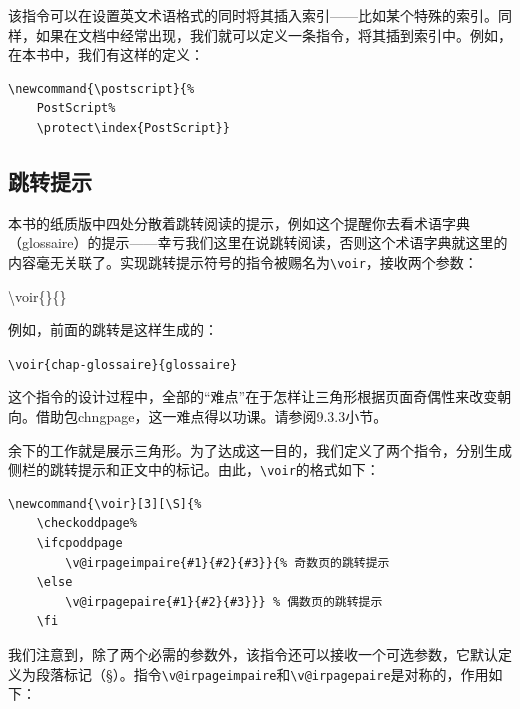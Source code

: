 该指令可以在设置英文术语格式的同时将其插入索引——比如某个特殊的索引。同样，如果在文档中经常出现，我们就可以定义一条指令，将其插到索引中。例如，在本书中，我们有这样的定义：

\begin{dmd}
\begin{verbatim}
\newcommand{\postscript}{% 
    PostScript% 
    \protect\index{PostScript}}\end{verbatim}
\end{dmd}

\subsection{跳转提示}

本书的纸质版中四处分散着跳转阅读的提示，例如这个提醒你去看术语字典（glossaire）的提示——幸亏我们这里在说跳转阅读，否则这个术语字典就这里的内容毫无关联了。实现跳转提示符号的指令被赐名为\verb|\voir|，接收两个参数：

\begin{dmd}
\backslash voir\{\}\{\}
\end{dmd}

例如，前面的跳转是这样生成的：

\begin{dmd}
\verb|\voir{chap-glossaire}{glossaire}|
\end{dmd}

这个指令的设计过程中，全部的“难点”在于怎样让三角形根据页面奇偶性来改变朝向。借助包\textsf{chngpage}，这一难点得以功课。请参阅9.3.3小节。

余下的工作就是展示三角形。为了达成这一目的，我们定义了两个指令，分别生成侧栏的跳转提示和正文中的标记。由此，\verb|\voir|的格式如下：

\begin{dmd}
\begin{verbatim}
\newcommand{\voir}[3][\S]{% 
    \checkoddpage% 
    \ifcpoddpage
        \v@irpageimpaire{#1}{#2}{#3}}{% 奇数页的跳转提示
    \else
        \v@irpagepaire{#1}{#2}{#3}}} % 偶数页的跳转提示
    \fi\end{verbatim}
\end{dmd}%

我们注意到，除了两个必需的参数外，该指令还可以接收一个可选参数，它默认定义为段落标记（\S）。指令\verb|\v@irpageimpaire|和\verb|\v@irpagepaire|是对称的，作用如下：

